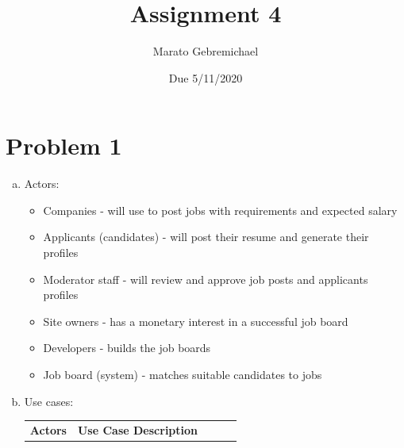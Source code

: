 \documentclass{article}
\title{Assignment 4}
\author{Marato Gebremichael}
\date{Due 5/11/2020}
\begin{document}
   \maketitle
   
\section*{Problem 1}   

\begin{enumerate}[(a)]

\item Actors:

   \begin{itemize}
      \item Companies - will use to post jobs with requirements and expected salary 
      \item Applicants (candidates) - will post their resume and generate their profiles
      \item Moderator staff - will review and approve job posts and applicants profiles
      \item Site owners - has a monetary interest in a successful job board
      \item Developers - builds the job boards
      \item Job board (system) - matches suitable candidates to jobs
   \end{itemize}

\item Use cases:
  
 \begin{table}[htbp]
	\centering
	\begin{tabular}{lllll}
		\textbf{Actors}  & \textbf{Use Case Description} &  &  &  \\
		

\end{tabular}
\end{table}
\end{enumerate}
\end{document}
